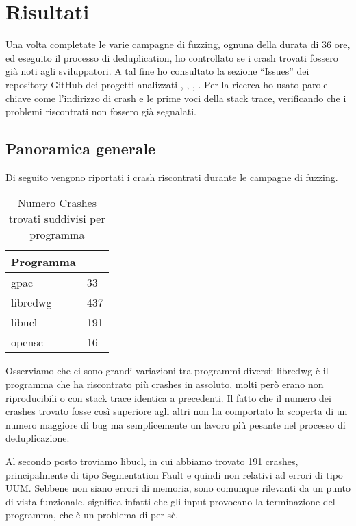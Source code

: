 
\chapter{Risultati}

Una volta completate le varie campagne di fuzzing, ognuna della durata di 36 ore, ed eseguito il processo di deduplication, ho controllato se i crash trovati fossero già noti agli sviluppatori. A tal fine ho consultato la sezione ``Issues'' dei repository GitHub dei progetti analizzati \cite{ref25}, \cite{ref26}, \cite{ref27}, \cite{ref28}.  
Per la ricerca ho usato parole chiave come l'indirizzo di crash e le prime voci della stack trace, verificando che i problemi riscontrati non fossero già segnalati.

\section{Panoramica generale}

Di seguito vengono riportati i crash riscontrati durante le campagne di fuzzing.

\begin{table}[ht]
  \centering
  \caption{Numero Crashes trovati suddivisi per programma}
  \label{tab:recap-crashes}
  \begin{tabular}{ll}
    \toprule
    \textbf{Programma} & \textbf{} \\
    \midrule
    gpac    & 33 \\
    libredwg & 437 \\
    libucl  & 191 \\
    opensc  & 16 \\
    \bottomrule
  \end{tabular}
\end{table}

Osserviamo che ci sono grandi variazioni tra programmi diversi: libredwg è il programma che ha riscontrato più crashes in assoluto, molti però erano non riproducibili o con stack trace identica a precedenti.
Il fatto che il numero dei crashes trovato fosse così superiore agli altri non ha comportato la scoperta di un numero maggiore di bug ma semplicemente un lavoro più pesante nel processo di deduplicazione. 

Al secondo posto troviamo libucl, in cui abbiamo trovato 191 crashes, principalmente di tipo Segmentation Fault e quindi non relativi ad errori di tipo UUM.
Sebbene non siano errori di memoria, sono comunque rilevanti da un punto di vista funzionale, significa infatti che gli input provocano la terminazione del programma, che è un problema di per sè. 

